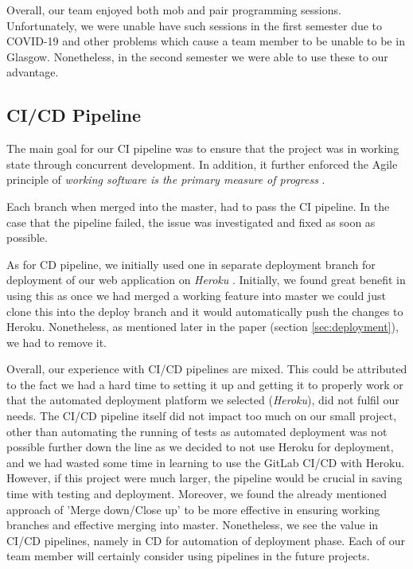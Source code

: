 \documentclass{l3proj}
\begin{document}
        
        Overall, our team enjoyed both mob and pair programming sessions. Unfortunately, we were unable have such sessions in the first semester due to COVID-19 and other problems which cause a team member to be unable to be in Glasgow. Nonetheless, in the second semester we were able to use these to our advantage. 
    \subsection{CI/CD Pipeline}
    \label{sec:cicd}
        The main goal for our CI pipeline was to ensure that the project was in working state through concurrent development. In addition, it further enforced the Agile principle of \textit{working software is the primary measure of progress} \cite{manifesto}.

        Each branch when merged into the master, had to pass the CI pipeline. In the case that the pipeline failed, the issue was investigated and fixed as soon as possible.

        As for CD pipeline, we initially used one in separate deployment branch for deployment of our web application on \textit{Heroku} \cite{heroku}. Initially, we found great benefit in using this as once we had merged a working feature into master we could just clone this into the deploy branch and it would automatically push the changes to Heroku. Nonetheless, as mentioned later in the paper (section \ref{sec:deployment}), we had to remove it.

        
        Overall, our experience with CI/CD pipelines are mixed. This could be attributed to the fact we had a hard time to setting it up and getting it to properly work or that the automated deployment platform we selected (\textit{Heroku}), did not fulfil our needs. The CI/CD pipeline itself did not impact too much on our small project, other than automating the running of tests as automated deployment was not possible further down the line as we decided to not use Heroku for deployment, and we had wasted some time in learning to use the GitLab CI/CD with Heroku. However, if this project were much larger, the pipeline would be crucial in saving time with testing and deployment. Moreover, we found the already mentioned approach of 'Merge down/Close up' \cite{merge} to be more effective in ensuring working branches and effective merging into master. Nonetheless, we see the value in CI/CD pipelines, namely in CD for automation of deployment phase. Each of our team member will certainly consider using pipelines in the future projects.
        
\end{document}
